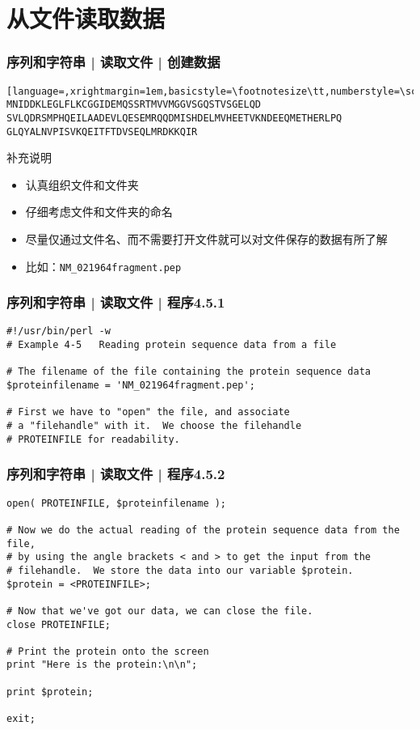 \section{从文件读取数据}
\begin{frame}[fragile]
  \frametitle{序列和字符串 | 读取文件 | 创建数据}
  \vspace{-1.5em}
\begin{lstlisting}[language=,xrightmargin=1em,basicstyle=\footnotesize\tt,numberstyle=\scriptsize]
MNIDDKLEGLFLKCGGIDEMQSSRTMVVMGGVSGQSTVSGELQD
SVLQDRSMPHQEILAADEVLQESEMRQQDMISHDELMVHEETVKNDEEQMETHERLPQ
GLQYALNVPISVKQEITFTDVSEQLMRDKKQIR
\end{lstlisting}
\pause
\begin{block}{补充说明}
  \begin{itemize}
    \item 认真组织文件和文件夹
    \item 仔细考虑文件和文件夹的命名
    \item 尽量仅通过文件名、而不需要打开文件就可以对文件保存的数据有所了解
    \item 比如：\verb|NM_021964fragment.pep|
  \end{itemize}
\end{block}
\end{frame}

\begin{frame}[fragile]
  \frametitle{序列和字符串 | 读取文件 | 程序4.5.1}
  \vspace{-1.5em}
\begin{lstlisting}
#!/usr/bin/perl -w
# Example 4-5   Reading protein sequence data from a file

# The filename of the file containing the protein sequence data
$proteinfilename = 'NM_021964fragment.pep';

# First we have to "open" the file, and associate
# a "filehandle" with it.  We choose the filehandle
# PROTEINFILE for readability.
\end{lstlisting}  
\end{frame}

\begin{frame}[fragile]
  \frametitle{序列和字符串 | 读取文件 | 程序4.5.2}
  \vspace{-1.5em}
\begin{lstlisting}[firstnumber=10,basicstyle=\footnotesize\tt]
open( PROTEINFILE, $proteinfilename );

# Now we do the actual reading of the protein sequence data from the file,
# by using the angle brackets < and > to get the input from the
# filehandle.  We store the data into our variable $protein.
$protein = <PROTEINFILE>;

# Now that we've got our data, we can close the file.
close PROTEINFILE;

# Print the protein onto the screen
print "Here is the protein:\n\n";

print $protein;

exit;
\end{lstlisting}  
\end{frame}

